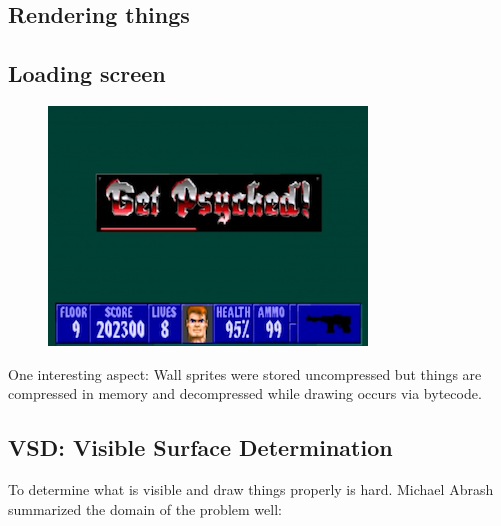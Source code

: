 \documentclass[book.tex]{subfiles}
\begin{document}
\subsection{Rendering things}
\subsection{Loading screen}
 \begin{figure}[H]
\centering
 \includegraphics[scale=1.3]{imgs/get_psyched.png}

 \end{figure}
 
One interesting aspect: Wall sprites were stored uncompressed but things are compressed in memory and decompressed while drawing occurs via bytecode.


\subsection{VSD: Visible Surface Determination}
To determine what is visible and draw things properly is hard. Michael Abrash summarized the domain of the problem well:\\
\end{document}
